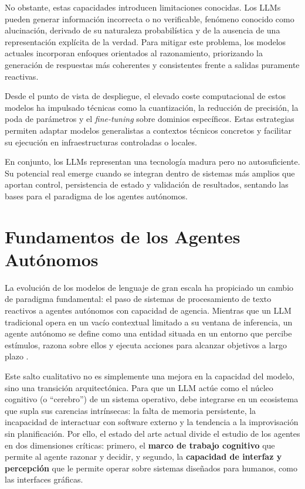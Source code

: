No obstante, estas capacidades introducen limitaciones conocidas. Los LLMs pueden generar información incorrecta o no verificable, fenómeno conocido como alucinación, derivado de su naturaleza probabilística y de la ausencia de una representación explícita de la verdad. \cite{ji2023hallucination}
Para mitigar este problema, los modelos actuales incorporan enfoques orientados al razonamiento, priorizando la generación de respuestas más coherentes y consistentes frente a salidas puramente reactivas. \cite{wei2022cot}

Desde el punto de vista de despliegue, el elevado coste computacional de estos modelos ha impulsado técnicas como la cuantización, la reducción de precisión, la poda de parámetros y el \textit{fine-tuning} sobre dominios específicos. \cite{dettmers2024qlora}
Estas estrategias permiten adaptar modelos generalistas a contextos técnicos concretos y facilitar su ejecución en infraestructuras controladas o locales.

En conjunto, los LLMs representan una tecnología madura pero no autosuficiente. Su potencial real emerge cuando se integran dentro de sistemas más amplios que aportan control, persistencia de estado y validación de resultados, sentando las bases para el paradigma de los agentes autónomos.



\section{Fundamentos de los Agentes Autónomos}

La evolución de los modelos de lenguaje de gran escala ha propiciado un cambio de paradigma fundamental: el paso de sistemas de procesamiento de texto reactivos a agentes autónomos con capacidad de agencia. Mientras que un LLM tradicional opera en un vacío contextual limitado a su ventana de inferencia, un agente autónomo se define como una entidad situada en un entorno que percibe estímulos, razona sobre ellos y ejecuta acciones para alcanzar objetivos a largo plazo \cite{wang2025survey}. 

Este salto cualitativo no es simplemente una mejora en la capacidad del modelo, sino una transición arquitectónica. Para que un LLM actúe como el núcleo cognitivo (o ``cerebro'') de un sistema operativo, debe integrarse en un ecosistema que supla sus carencias intrínsecas: la falta de memoria persistente, la incapacidad de interactuar con software externo y la tendencia a la improvisación sin planificación. Por ello, el estado del arte actual divide el estudio de los agentes en dos dimensiones críticas: primero, el \textbf{marco de trabajo cognitivo} que permite al agente razonar y decidir, y segundo, la \textbf{capacidad de interfaz y percepción} que le permite operar sobre sistemas diseñados para humanos, como las interfaces gráficas.

